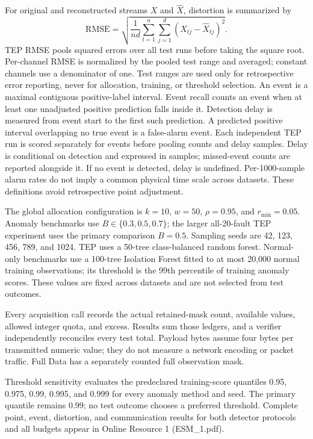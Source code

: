 \documentclass[pdflatex,sn-vancouver-num]{sn-jnl}
\theoremstyle{thmstyleone}
\begin{document}
For original and reconstructed streams $X$ and $\widehat X$, distortion is
summarized by
\begin{equation}
 \mathrm{RMSE}=\sqrt{\frac{1}{nd}\sum_{t=1}^{n}\sum_{j=1}^{d}
 (X_{tj}-\widehat X_{tj})^2}.
\end{equation}
TEP RMSE pools squared errors over all test runs before taking the square root.
Per-channel RMSE is normalized by the pooled test range and averaged; constant
channels use a denominator of one. Test ranges are used only for retrospective
error reporting, never for allocation, training, or threshold selection.
An event is a maximal contiguous positive-label interval. Event recall counts
an event when at least one unadjusted positive prediction falls inside it.
Detection delay is measured from event start to the first such prediction. A
predicted positive interval overlapping no true event is a false-alarm event.
Each independent TEP run is scored separately for events before pooling counts
and delay samples. Delay is conditional on detection and expressed in samples;
missed-event counts are reported alongside it. If no event is detected, delay
is undefined. Per-1000-sample alarm rates do not imply a common physical time
scale across datasets. These definitions avoid retrospective point adjustment.

The global allocation configuration is $k=10$, $w=50$, $\rho=0.95$, and
$r_{\min}=0.05$. Anomaly benchmarks use $B\in\{0.3,0.5,0.7\}$; the larger
all-20-fault TEP experiment uses the primary comparison $B=0.5$.
Sampling seeds are 42, 123, 456,
789, and 1024. TEP uses a 50-tree class-balanced random forest. Normal-only
benchmarks use a 100-tree Isolation Forest fitted to at most 20,000 normal
training observations; its threshold is the 99th percentile of training
anomaly scores. These values are fixed across datasets and are not selected
from test outcomes.

Every acquisition call records the actual retained-mask count, available values,
allowed integer quota, and excess. Results sum those ledgers, and a verifier
independently reconciles every test total. Payload bytes assume four bytes per
transmitted numeric value; they do not measure a network encoding or packet
traffic. Full Data has a separately counted full observation mask.

Threshold sensitivity evaluates the predeclared training-score quantiles
0.95, 0.975, 0.99, 0.995, and 0.999 for every anomaly method and seed. The primary
quantile remains 0.99; no test outcome chooses a preferred threshold. Complete
point, event, distortion, and communication results for both detector protocols
and all budgets appear in Online Resource 1 (ESM\_1.pdf).
\end{document}
